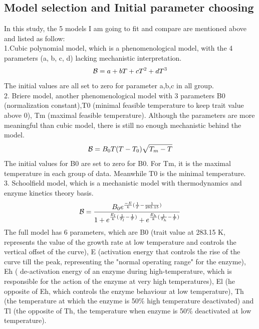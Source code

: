\documentclass[12pt,a4paper]{article}
\begin{document}
\subsection{Model selection and Initial parameter choosing}
In this study, the 5 models I am going to fit and compare are mentioned above and listed as follow:
\\
1.Cubic polynomial model, which is a phenomenological model, with the 4 parameters (a, b, c, d) lacking mechanistic interpretation.
\begin{equation}
\mathcal B = a+bT+cT^2+dT^3
\\
\end{equation}
The initial values are all set to zero for parameter a,b,c in all group.
\\
2. Briere model, another phenomenological model with 3 parameters B0 (normalization constant),T0 (minimal feasible temperature to keep trait value above 0), Tm (maximal feasible temperature). Although the parameters are more meaningful than cubic model, there is still no enough mechanistic behind the model.
\begin{equation}
\mathcal B = B_0T(T-T_0)\sqrt{T_m-T}
\\
\end{equation}
The initial values for B0 are set to zero for B0. For Tm, it is the maximal temperature in each group of data. Meanwhile T0 is the minimal temperature.
\\
3. Schoolfield model, which is a mechanistic model with thermodynamics and enzyme kinetics theory basis. \\
\begin{equation}
\mathcal B = \frac{B_0e^{\frac{-E}{k}(\frac{1}{T}-\frac{1}{283.15})}}{1+e^{\frac{E_l}{k}(\frac{1}{T_l}-\frac{1}{T})}+e^{\frac{E_h}{k}(\frac{1}{T_h}-\frac{1}{T})}}
\\
\end{equation}
The full model has 6 parameters, which are B0 (trait value at 283.15 K, represents the value of the growth rate at low temperature and controls the vertical offset of the curve), E (activation energy that controls the rise of the curve till the peak, representing the "normal operating range" for the enzyme), Eh ( de-activation energy of an enzyme during high-temperature, which is responsible for the action of the enzyme at very high temperatures), El (he opposite of Eh, which controls the enzyme behaviour at low temperature), Th (the temperature at which the enzyme is 50\% high temperature deactivated) and Tl (the opposite of Th, the temperature when enzyme is 50\% deactivated at low temperature).
\end{document}
